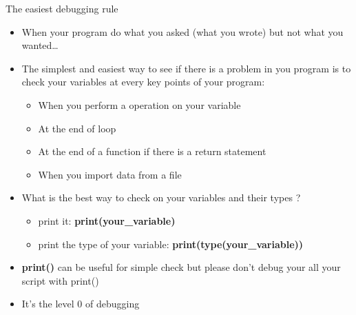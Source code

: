 \documentclass[
  8pt,
  ignorenonframetext,
]{beamer}
\providecommand{\tightlist}{%
  \setlength{\itemsep}{0pt}\setlength{\parskip}{0pt}}
\begin{document}
\begin{frame}{The easiest debugging rule}
\protect\hypertarget{the-easiest-debugging-rule}{}
\begin{itemize}[<+->]
\tightlist
\item
  When your program do what you asked (what you wrote) but not what you
  wanted\ldots{}
\end{itemize}

\begin{itemize}[<+->]
\tightlist
\item
  The simplest and easiest way to see if there is a problem in you
  program is to check your variables at every key points of your
  program:

  \begin{itemize}[<+->]
  \tightlist
  \item
    When you perform a operation on your variable
  \item
    At the end of loop
  \item
    At the end of a function if there is a return statement
  \item
    When you import data from a file
  \end{itemize}
\end{itemize}

\begin{itemize}[<+->]
\tightlist
\item
  What is the best way to check on your variables and their types ?

  \begin{itemize}[<+->]
  \tightlist
  \item
    print it: \textbf{print(your\_variable)}
  \item
    print the type of your variable:
    \textbf{print(type(your\_variable))}
  \end{itemize}
\end{itemize}

\begin{itemize}[<+->]
\tightlist
\item
  \textbf{print()} can be useful for simple check but please don't debug
  your all your script with print()
\end{itemize}

\begin{itemize}[<+->]
\tightlist
\item
  It's the level 0 of debugging
\end{itemize}
\end{frame}
\end{document}
